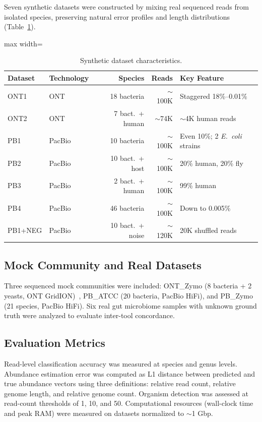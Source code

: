 \documentclass[11pt]{article}
\begin{document}
Seven synthetic datasets were constructed by mixing real sequenced reads from isolated species, preserving natural error profiles and length distributions (Table~\ref{tab:synthetic}).

\begin{table}[ht]
\centering
\caption{Synthetic dataset characteristics.}
\label{tab:synthetic}
\begin{adjustbox}{max width=\textwidth}
\begin{tabular}{@{}llrrl@{}}
\toprule
Dataset & Technology & Species & Reads & Key Feature \\
\midrule
ONT1 & ONT & 18 bacteria & $\sim$100K & Staggered 18\%--0.01\% \\
ONT2 & ONT & 7 bact.\ + human & $\sim$74K & $\sim$4K human reads \\
PB1 & PacBio & 10 bacteria & $\sim$100K & Even 10\%; 2 \emph{E.\ coli} strains \\
PB2 & PacBio & 10 bact.\ + host & $\sim$100K & 20\% human, 20\% fly \\
PB3 & PacBio & 2 bact.\ + human & $\sim$100K & 99\% human \\
PB4 & PacBio & 46 bacteria & $\sim$100K & Down to 0.005\% \\
PB1+NEG & PacBio & 10 bact.\ + noise & $\sim$120K & 20K shuffled reads \\
\bottomrule
\end{tabular}
\end{adjustbox}
\end{table}

\subsection{Mock Community and Real Datasets}

Three sequenced mock communities were included: ONT\_Zymo (8 bacteria + 2 yeasts, ONT GridION)~\citep{nicholls2019ultralong}, PB\_ATCC (20 bacteria, PacBio HiFi), and PB\_Zymo (21 species, PacBio HiFi).  Six real gut microbiome samples with unknown ground truth were analyzed to evaluate inter-tool concordance.

\subsection{Evaluation Metrics}

Read-level classification accuracy was measured at species and genus levels.  Abundance estimation error was computed as L1 distance between predicted and true abundance vectors using three definitions: relative read count, relative genome length, and relative genome count.  Organism detection was assessed at read-count thresholds of 1, 10, and 50.  Computational resources (wall-clock time and peak RAM) were measured on datasets normalized to $\sim$1 Gbp.
\end{document}
